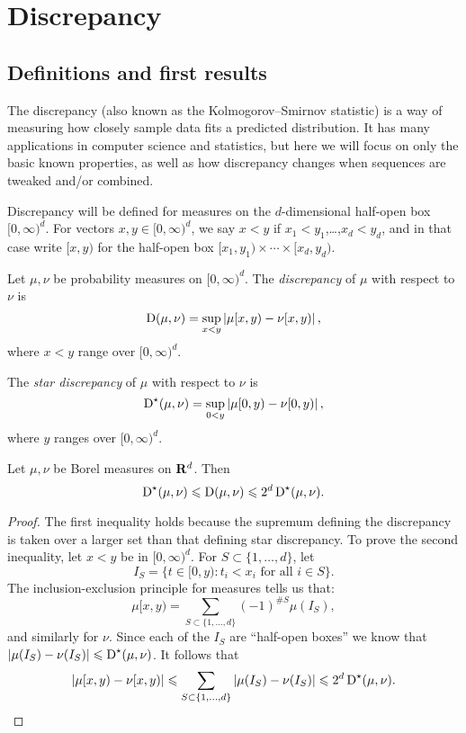 
\chapter{Discrepancy}





\section{Definitions and first results}

The discrepancy (also known as the Kolmogorov--Smirnov statistic) is a way of 
measuring how closely sample data fits a predicted distribution. It has many 
applications in computer science and statistics, but here we will focus on only 
the basic known properties, as well as how discrepancy changes when sequences 
are tweaked and/or combined. 

Discrepancy will be defined for measures on the $d$-dimensional half-open box 
$[0,\infty)^d$. For vectors $x,y\in [0,\infty)^d$, we say $x<y$ if 
$x_1<y_1$,\dots,$x_d<y_d$, and in that case write $[x,y)$ for the half-open 
box $[x_1,y_1)\times \cdots \times [x_d,y_d)$. 

\begin{definition}
Let $\mu, \nu$ be probability measures on $[0,\infty)^d$. The 
\emph{discrepancy} of $\mu$ with respect to $\nu$ is 
\[
	\operatorname{D}(\mu,\nu) = \sup_{x < y} \left| \mu[x,y) - \nu[x,y)\right| ,
\]
where $x<y$ range over $[0,\infty)^d$.

The \emph{star discrepancy} of $\mu$ with respect to $\nu$ is 
\[
	\operatorname{D}^\star(\mu,\nu) = \sup_{0<y} \left| \mu[0,y) - \nu[0,y)\right| ,
\]
where $y$ ranges over $[0,\infty)^d$. 
\end{definition}

\begin{lemma}
Let $\mu,\nu$ be Borel measures on $\mathbf{R}^d$. Then 
\[
	\operatorname{D}^\star(\mu,\nu) \leqslant \operatorname{D}(\mu,\nu) \leqslant 2^d \operatorname{D}^\star(\mu,\nu) .
\]
\end{lemma}
\begin{proof}
The first inequality holds because the supremum defining the discrepancy is 
taken over a larger set than that defining star discrepancy. To prove the 
second inequality, let $x<y$ be in $[0,\infty)^d$. For 
$S\subset \{1,\dots,d\}$, let 
\[
	I_S = \{ t \in [0,y) : t_i < x_i \text{ for all }i\in S\} .
\]
The inclusion-exclusion principle for measures tells us that: 
\[
	\mu[x,y) = \sum_{S\subset \{1,\dots,d\}} (-1)^{\# S} \mu(I_S) ,
\]
and similarly for $\nu$. Since each of the $I_S$ are ``half-open boxes'' 
we know that $|\mu(I_S) - \nu(I_S)| \leqslant \operatorname{D}^\star(\mu,\nu)$. It 
follows that 
\[
	|\mu[x,y) - \nu[x,y)| \leqslant \sum_{S\subset \{1,\dots,d\}} |\mu(I_S) - \nu(I_S)| \leqslant 2^d \operatorname{D}^\star(\mu,\nu) .
\]
\end{proof}

